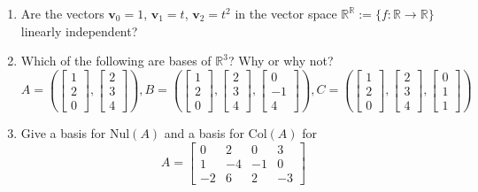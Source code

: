 \documentclass[12pt,oneside]{amsart}
\newcommand{\bv}{\mathbf{v}}
\newcommand{\R}{\mathbb{R}}
\newcommand{\vd}[3]{\left[\begin{matrix} #1 \\ #2 \\ #3 \end{matrix}\right]}
\begin{document}
\begin{enumerate}
\item Are the vectors $\bv_0 = 1$, $\bv_1 = t$, $\bv_2 =t^2$ in the vector space $\R^\R := \{ f \colon \R \to \R \}$ linearly independent?



\item
 Which of the following are bases of $\R^3$? Why or why not?
\[ A = ( \vd{1}{2}{0}, \vd{2}{3}{4} ), B = ( \vd{1}{2}{0}, \vd{2}{3}{4}, \vd{0}{-1}{4} ), C = (\vd{1}{2}{0}, \vd{2}{3}{4}, \vd{0}{1}{1} ) \]



\item Give a basis for Nul$(A)$ and a basis for Col$(A)$ for
\[ A = \left[ \begin{matrix}
 0 & 2 & 0 & 3 \\
 1 & -4 & -1 & 0 \\
 -2 & 6 & 2 & -3
 \end{matrix} \right] \]



\end{enumerate}
\end{document}

